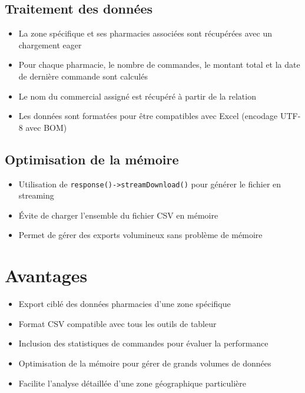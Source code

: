 \documentclass[12pt,a4paper]{article}
\begin{document}
\subsection{Traitement des données}
\begin{itemize}
    \item La zone spécifique et ses pharmacies associées sont récupérées avec un chargement eager
    \item Pour chaque pharmacie, le nombre de commandes, le montant total et la date de dernière commande sont calculés
    \item Le nom du commercial assigné est récupéré à partir de la relation
    \item Les données sont formatées pour être compatibles avec Excel (encodage UTF-8 avec BOM)
\end{itemize}

\subsection{Optimisation de la mémoire}
\begin{itemize}
    \item Utilisation de \texttt{response()->streamDownload()} pour générer le fichier en streaming
    \item Évite de charger l'ensemble du fichier CSV en mémoire
    \item Permet de gérer des exports volumineux sans problème de mémoire
\end{itemize}

\section{Avantages}
\begin{itemize}
    \item Export ciblé des données pharmacies d'une zone spécifique
    \item Format CSV compatible avec tous les outils de tableur
    \item Inclusion des statistiques de commandes pour évaluer la performance
    \item Optimisation de la mémoire pour gérer de grands volumes de données
    \item Facilite l'analyse détaillée d'une zone géographique particulière
\end{itemize}
\end{document}
